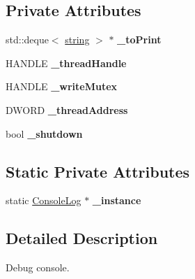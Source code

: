 \subsection*{Private Attributes}
\begin{DoxyCompactItemize}
\item 
std\+::deque$<$ \hyperlink{class_ensum_1_1string}{string} $>$ $\ast$ {\bfseries \+\_\+to\+Print}\hypertarget{class_ensum_1_1_utils_1_1_console_log_a8be721f764eb1f8330d4a2646a840a5d}{}\label{class_ensum_1_1_utils_1_1_console_log_a8be721f764eb1f8330d4a2646a840a5d}

\item 
H\+A\+N\+D\+LE {\bfseries \+\_\+thread\+Handle}\hypertarget{class_ensum_1_1_utils_1_1_console_log_aa93afd55081441f111fc804da614913e}{}\label{class_ensum_1_1_utils_1_1_console_log_aa93afd55081441f111fc804da614913e}

\item 
H\+A\+N\+D\+LE {\bfseries \+\_\+write\+Mutex}\hypertarget{class_ensum_1_1_utils_1_1_console_log_a1b8a903c69d744529d98d29f728cafcf}{}\label{class_ensum_1_1_utils_1_1_console_log_a1b8a903c69d744529d98d29f728cafcf}

\item 
D\+W\+O\+RD {\bfseries \+\_\+thread\+Address}\hypertarget{class_ensum_1_1_utils_1_1_console_log_a5258e193fd534462a6f5ff3a3a0a9072}{}\label{class_ensum_1_1_utils_1_1_console_log_a5258e193fd534462a6f5ff3a3a0a9072}

\item 
bool {\bfseries \+\_\+shutdown}\hypertarget{class_ensum_1_1_utils_1_1_console_log_abfe63ce28323a8554b5515ef684e582e}{}\label{class_ensum_1_1_utils_1_1_console_log_abfe63ce28323a8554b5515ef684e582e}

\end{DoxyCompactItemize}
\subsection*{Static Private Attributes}
\begin{DoxyCompactItemize}
\item 
static \hyperlink{class_ensum_1_1_utils_1_1_console_log}{Console\+Log} $\ast$ {\bfseries \+\_\+instance}\hypertarget{class_ensum_1_1_utils_1_1_console_log_ace276a80cd230798d08539f05816cdcb}{}\label{class_ensum_1_1_utils_1_1_console_log_ace276a80cd230798d08539f05816cdcb}

\end{DoxyCompactItemize}


\subsection{Detailed Description}
Debug console. 

